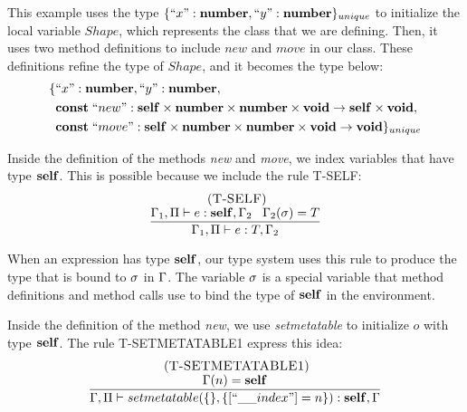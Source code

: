 This example uses the type $\{``x":\mathbf{number}, ``y":\mathbf{number}\}_{unique}$ to
initialize the local variable $Shape$, which represents the class
that we are defining.
Then, it uses two method definitions to include $new$ and $move$ in our class.
These definitions refine the type of $Shape$, and it becomes the type below:
\begin{align*}
\{ & ``x":\mathbf{number}, ``y":\mathbf{number},\\
   & \mathbf{const} \; ``new":\mathbf{self} \times \mathbf{number} \times \mathbf{number} \times \mathbf{void} \rightarrow \mathbf{self} \times \mathbf{void},\\
   & \mathbf{const} \; ``move":\mathbf{self} \times \mathbf{number} \times \mathbf{number} \times \mathbf{void} \rightarrow \mathbf{void} \}_{unique}
\end{align*}

Inside the definition of the methods \emph{new} and \emph{move},
we index variables that have type $\mathbf{self}$.
This is possible because we include the rule \textsc{T-SELF}:
\[
\begin{array}{c}
\; (\textsc{T-SELF})\\
\dfrac{\Gamma_{1}, \Pi \vdash e:\mathbf{self}, \Gamma_{2} \;\;\;
       \Gamma_{2}(\sigma) = T}
      {\Gamma_{1}, \Pi \vdash e:T, \Gamma_{2}}
\end{array}
\]

When an expression has type $\mathbf{self}$, our type system uses this
rule to produce the type that is bound to $\sigma$ in $\Gamma$.
The variable $\sigma$ is a special variable that method definitions
and method calls use to bind the type of $\mathbf{self}$ in the environment.

Inside the definition of the method \emph{new}, we use \emph{setmetatable}
to initialize $o$ with type $\mathbf{self}$.
The rule \textsc{T-SETMETATABLE1} express this idea:
\[
\begin{array}{c}
\mylabel{T-SETMETATABLE1}\\
\dfrac{\env(n) = \Self}
      {\env, \penv \vdash setmetatable(\{\}, \{[``\string_\string_index"] = n\}):\Self, \env}
\end{array}
\]


